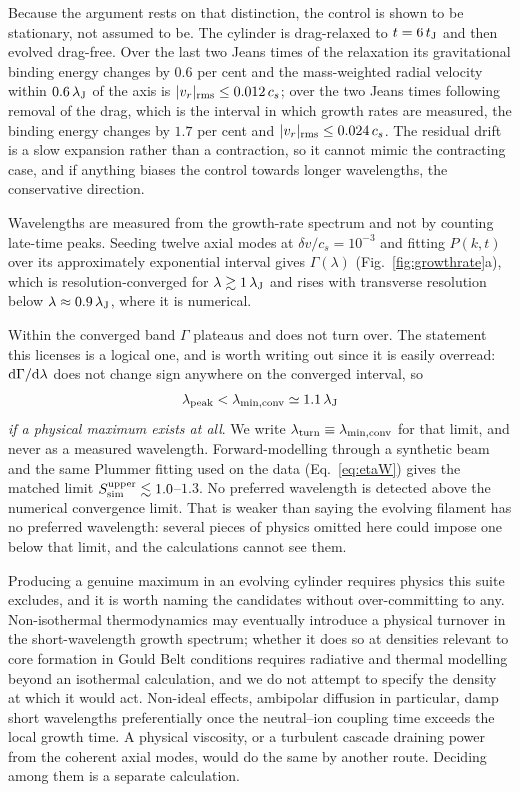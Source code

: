 \documentclass[usenatbib,twoside,twocolumn]{mnras}
\begin{document}
Because the argument rests on that distinction, the control is shown to be stationary, not assumed to be. The cylinder is drag-relaxed to $t=6\,t_{\rm J}$ and then evolved drag-free. Over the last two Jeans times of the relaxation its gravitational binding energy changes by $0.6$ per cent and the mass-weighted radial velocity within $0.6\,\lambda_{\rm J}$ of the axis is $|v_r|_{\rm rms}\leq0.012\,c_s$; over the two Jeans times following removal of the drag, which is the interval in which growth rates are measured, the binding energy changes by $1.7$ per cent and $|v_r|_{\rm rms}\leq0.024\,c_s$. The residual drift is a slow expansion rather than a contraction, so it cannot mimic the contracting case, and if anything biases the control towards longer wavelengths, the conservative direction.

Wavelengths are measured from the growth-rate spectrum and not by counting late-time peaks. Seeding twelve axial modes at $\delta v/c_s=10^{-3}$ and fitting $P(k,t)$ over its approximately exponential interval gives $\Gamma(\lambda)$ (Fig.~\ref{fig:growthrate}a), which is resolution-converged for $\lambda\gtrsim1\,\lambda_{\rm J}$ and rises with transverse resolution below $\lambda\approx0.9\,\lambda_{\rm J}$, where it is numerical.

Within the converged band $\Gamma$ plateaus and does not turn over. The statement this licenses is a logical one, and is worth writing out since it is easily overread: ${\rm d}\Gamma/{\rm d}\lambda$ does not change sign anywhere on the converged interval, so
\begin{equation}
\lambda_{\rm peak}<\lambda_{\rm min,conv}\simeq1.1\,\lambda_{\rm J}
\label{eq:bound}
\end{equation}
\emph{if a physical maximum exists at all}. We write $\lambda_{\rm turn}\equiv\lambda_{\rm min,conv}$ for that limit, and never as a measured wavelength. Forward-modelling through a synthetic beam and the same Plummer fitting used on the data (Eq.~\ref{eq:etaW}) gives the matched limit $S_{\rm sim}^{\rm upper}\lesssim1.0$--$1.3$. No preferred wavelength is detected above the numerical convergence limit. That is weaker than saying the evolving filament has no preferred wavelength: several pieces of physics omitted here could impose one below that limit, and the calculations cannot see them.

Producing a genuine maximum in an evolving cylinder requires physics this suite excludes, and it is worth naming the candidates without over-committing to any. Non-isothermal thermodynamics may eventually introduce a physical turnover in the short-wavelength growth spectrum; whether it does so at densities relevant to core formation in Gould Belt conditions requires radiative and thermal modelling beyond an isothermal calculation, and we do not attempt to specify the density at which it would act. Non-ideal effects, ambipolar diffusion in particular, damp short wavelengths preferentially once the neutral--ion coupling time exceeds the local growth time. A physical viscosity, or a turbulent cascade draining power from the coherent axial modes, would do the same by another route. Deciding among them is a separate calculation.
\end{document}
